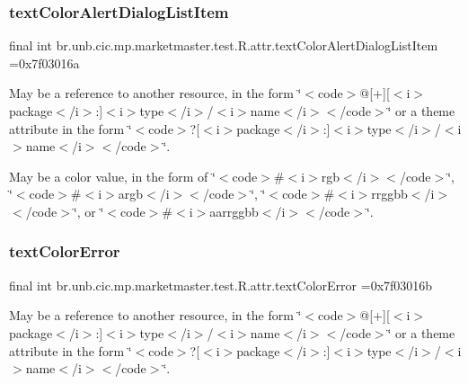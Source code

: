 \subsubsection{\texorpdfstring{text\+Color\+Alert\+Dialog\+List\+Item}{textColorAlertDialogListItem}}
{\footnotesize\ttfamily final int br.\+unb.\+cic.\+mp.\+marketmaster.\+test.\+R.\+attr.\+text\+Color\+Alert\+Dialog\+List\+Item =0x7f03016a\hspace{0.3cm}{\ttfamily [static]}}

May be a reference to another resource, in the form \char`\"{}$<$code$>$@\mbox{[}+\mbox{]}\mbox{[}$<$i$>$package$<$/i$>$\+:\mbox{]}$<$i$>$type$<$/i$>$/$<$i$>$name$<$/i$>$$<$/code$>$\char`\"{} or a theme attribute in the form \char`\"{}$<$code$>$?\mbox{[}$<$i$>$package$<$/i$>$\+:\mbox{]}$<$i$>$type$<$/i$>$/$<$i$>$name$<$/i$>$$<$/code$>$\char`\"{}. 

May be a color value, in the form of \char`\"{}$<$code$>$\#$<$i$>$rgb$<$/i$>$$<$/code$>$\char`\"{}, \char`\"{}$<$code$>$\#$<$i$>$argb$<$/i$>$$<$/code$>$\char`\"{}, \char`\"{}$<$code$>$\#$<$i$>$rrggbb$<$/i$>$$<$/code$>$\char`\"{}, or \char`\"{}$<$code$>$\#$<$i$>$aarrggbb$<$/i$>$$<$/code$>$\char`\"{}. \mbox{\label{classbr_1_1unb_1_1cic_1_1mp_1_1marketmaster_1_1test_1_1R_1_1attr_ab67cda9a84686b9cf58f7438e01cbf11}} 
\subsubsection{\texorpdfstring{text\+Color\+Error}{textColorError}}
{\footnotesize\ttfamily final int br.\+unb.\+cic.\+mp.\+marketmaster.\+test.\+R.\+attr.\+text\+Color\+Error =0x7f03016b\hspace{0.3cm}{\ttfamily [static]}}

May be a reference to another resource, in the form \char`\"{}$<$code$>$@\mbox{[}+\mbox{]}\mbox{[}$<$i$>$package$<$/i$>$\+:\mbox{]}$<$i$>$type$<$/i$>$/$<$i$>$name$<$/i$>$$<$/code$>$\char`\"{} or a theme attribute in the form \char`\"{}$<$code$>$?\mbox{[}$<$i$>$package$<$/i$>$\+:\mbox{]}$<$i$>$type$<$/i$>$/$<$i$>$name$<$/i$>$$<$/code$>$\char`\"{}. 

